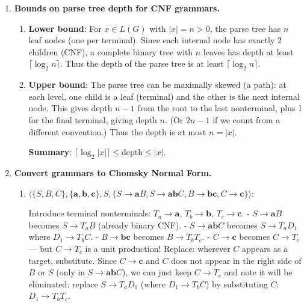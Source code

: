 \begin{enumerate}[{9.}1. ]
\textbf{Correct statement}: In a CNF grammar, any derivation of a string $x$ with $|x| \geq 1$ uses exactly $2|x|-1$ productions.

\textbf{Proof}: Each production is either of the form $A \to BC$ (increases the count of nonterminals by 1) or $A \to a$ (converts one nonterminal to a terminal, does not increase count). Start with 1 nonterminal. After $k$ productions of the form $A \to BC$, we have $k+1$ nonterminals and 0 terminals. Each terminal production reduces nonterminals by 1 and adds 1 terminal. To produce $|x|$ terminals, we need $|x|$ terminal productions. The total nonterminals created = $k+1$ and consumed = $|x|$, so $k+1 = |x|$, giving $k = |x|-1$ binary productions. Total productions $= (|x|-1) + |x| = 2|x|-1$. \qed

\item \textbf{Bounds on parse tree depth for CNF grammars.}

\begin{enumerate}
\item \textbf{Lower bound}: For $x \in L(G)$ with $|x| = n > 0$, the parse tree has $n$ leaf nodes (one per terminal). Since each internal node has exactly 2 children (CNF), a complete binary tree with $n$ leaves has depth at least $\lceil \log_2 n \rceil$. Thus the depth of the parse tree is at least $\lceil \log_2 n \rceil$.

\item \textbf{Upper bound}: The parse tree can be maximally skewed (a path): at each level, one child is a leaf (terminal) and the other is the next internal node. This gives depth $n-1$ from the root to the last nonterminal, plus 1 for the final terminal, giving depth $n$. (Or $2n-1$ if we count from a different convention.) Thus the depth is at most $n = |x|$.

\textbf{Summary}: $\lceil \log_2 |x| \rceil \leq \text{depth} \leq |x|$.
\end{enumerate}

\item \textbf{Convert grammars to Chomsky Normal Form.}

\begin{enumerate}
\item $\langle\{S,B,C\},\{\pmb{a},\pmb{b},\pmb{c}\},S,\{S\to\pmb{a}B,S\to\pmb{ab}C,B\to\pmb{bc},C\to\pmb{c}\}\rangle$:

Introduce terminal nonterminals: $T_a \to \pmb{a}$, $T_b \to \pmb{b}$, $T_c \to \pmb{c}$.
- $S \to \pmb{a}B$ becomes $S \to T_a B$ (already binary CNF).
- $S \to \pmb{ab}C$ becomes $S \to T_a D_1$ where $D_1 \to T_b C$.
- $B \to \pmb{bc}$ becomes $B \to T_b T_c$.
- $C \to \pmb{c}$ becomes $C \to T_c$ --- but $C \to T_c$ is a unit production! Replace: wherever $C$ appears as a target, substitute. Since $C \to \pmb{c}$ and $C$ does not appear in the right side of $B$ or $S$ (only in $S \to \pmb{ab}C$), we can just keep $C \to T_c$ and note it will be eliminated: replace $S \to T_a D_1$ (where $D_1 \to T_b C$) by substituting $C$: $D_1 \to T_b T_c$.


\end{enumerate}
\end{enumerate}
